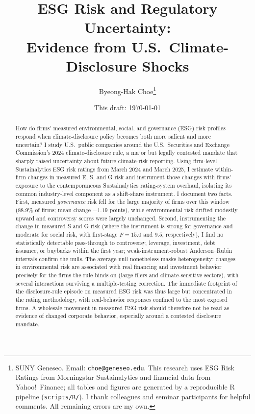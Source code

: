 \documentclass[12pt]{article}
\title{\textbf{ESG Risk and Regulatory Uncertainty:\\
Evidence from U.S.\ Climate-Disclosure Shocks}}
\author{Byeong-Hak Choe\thanks{SUNY Geneseo. Email: \texttt{choe@geneseo.edu}.
This research uses ESG Risk Ratings from Morningstar Sustainalytics and financial
data from Yahoo!\ Finance; all tables and figures are generated by a reproducible
R pipeline (\texttt{scripts/R/}). I thank colleagues and seminar participants for
helpful comments. All remaining errors are my own.}}
\date{This draft: \today}
\begin{document}
\maketitle

\begin{abstract}
\noindent How do firms' measured environmental, social, and governance (ESG) risk profiles
respond when climate-disclosure policy becomes both more salient and more uncertain? I study
U.S.\ public companies around the U.S.\ Securities and Exchange Commission's 2024
climate-disclosure rule, a major but legally contested mandate that sharply raised uncertainty
about future climate-risk reporting. Using firm-level Sustainalytics ESG risk ratings from
March 2024 and March 2025, I estimate within-firm changes in measured E, S, and G risk and
instrument those changes with firms' exposure to the contemporaneous Sustainalytics
rating-system overhaul, isolating its common industry-level component as a shift-share
instrument. I document two facts. First, measured \emph{governance} risk fell for the large
majority of firms over this window (88.9\% of firms; mean change $-1.19$ points), while
environmental risk drifted modestly upward and controversy scores were largely unchanged.
Second, instrumenting the change in measured S and G risk (where the instrument is strong for
governance and moderate for social risk, with first-stage $F = 15.0$ and $9.5$, respectively), I
find no statistically detectable pass-through to controversy, leverage, investment, debt issuance,
or buybacks within the first year; weak-instrument-robust Anderson--Rubin intervals confirm the
nulls. The average null nonetheless masks heterogeneity: changes in environmental risk are
associated with real financing and investment behavior precisely for the firms the rule binds on
(large filers and climate-sensitive sectors), with several interactions surviving a multiple-testing
correction. The
immediate footprint of the disclosure-rule episode on measured ESG risk was thus large but
concentrated in the rating methodology, with real-behavior responses confined to the most exposed
firms. A wholesale movement in measured ESG risk should therefore not be read as evidence of
changed corporate behavior, especially around a contested disclosure mandate.
\end{abstract}

\end{document}

